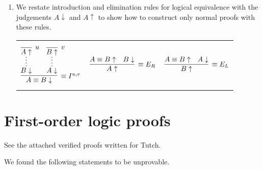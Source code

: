 \documentclass[11pt,letterpaper]{article}
\newcommand{\neut}{\uparrow}
\newcommand{\norm}{\downarrow}
\begin{document}
\begin{enumerate}
\begin{proof}
\begin{description}
                    This proof is essentially the same as for $\equiv E_L$ so
                    we will omit it.
            \end{description}
        \end{proof}

    \item
        We restate introduction and elimination rules for logical equivalence
        with the judgements $A\norm$ and $A\neut$ to show how to construct only
        normal proofs with these rules.

        \begin{center}
            \begin{tabular}{c c c}
                $$
                \infer[\equiv I^{u,v}]{A \equiv B \norm}{
                    \infer*{B \norm}{
                        \infer[u]{A \neut}{}
                    }
                    &
                    \infer*{A \norm}{
                        \infer[v]{B \neut}{}
                    }
                }
                $$
                &
                $$
                \infer[\equiv E_R]{A \neut}{
                    A \equiv B \neut
                    &
                    B \norm
                }
                $$
                &
                $$
                \infer[\equiv E_L]{B \neut}{
                    A \equiv B \neut
                    &
                    A \norm
                }
                $$
            \end{tabular}
        \end{center}

\end{enumerate}

\section{First-order logic proofs}

See the attached verified proofs written for Tutch.

We found the following statements to be unprovable.
\end{document}
